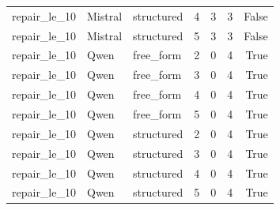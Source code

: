 \begin{longtable}{lllrrrr}
repair\_le\_10 & Mistral & structured & 4 & 3 & 3 & False \\
repair\_le\_10 & Mistral & structured & 5 & 3 & 3 & False \\
repair\_le\_10 & Qwen & free\_form & 2 & 0 & 4 & True \\
repair\_le\_10 & Qwen & free\_form & 3 & 0 & 4 & True \\
repair\_le\_10 & Qwen & free\_form & 4 & 0 & 4 & True \\
repair\_le\_10 & Qwen & free\_form & 5 & 0 & 4 & True \\
repair\_le\_10 & Qwen & structured & 2 & 0 & 4 & True \\
repair\_le\_10 & Qwen & structured & 3 & 0 & 4 & True \\
repair\_le\_10 & Qwen & structured & 4 & 0 & 4 & True \\
repair\_le\_10 & Qwen & structured & 5 & 0 & 4 & True \\
\end{longtable}
